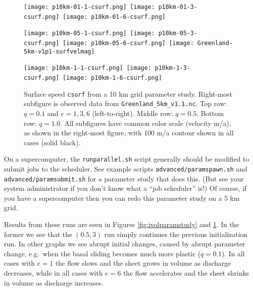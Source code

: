 \begin{figure}[ht]
\centering
\mbox{\texttt{[image: p10km-01-1-csurf.png]} \texttt{[image: p10km-01-3-csurf.png]} \texttt{[image: p10km-01-6-csurf.png]} \qquad \hspace{1.87in}}

\mbox{\texttt{[image: p10km-05-1-csurf.png]} \texttt{[image: p10km-05-3-csurf.png]} \texttt{[image: p10km-05-6-csurf.png]} 
\texttt{[image: Greenland-5km-v1p1-surfvelmag]}}
\smallskip

\mbox{\texttt{[image: p10km-1-1-csurf.png]} \texttt{[image: p10km-1-3-csurf.png]} \texttt{[image: p10km-1-6-csurf.png]} \qquad \hspace{1.87in}}

\caption{Surface speed \texttt{csurf} from a 10 km grid parameter study.  Right-most subfigure is observed data from \texttt{Greenland_5km_v1.1.nc}.  Top row: $q=0.1$ and $e=1,3,6$ (left-to-right).  Middle row: $q=0.5$.  Bottom row: $q=1.0$.  All subfigures have common color scale (velocity m/a), as shown in the right-most figure, with 100 m/a contour shown in all cases (solid black).}
\label{fig:paramstudy}
\end{figure}

On a supercomputer, the \texttt{runparallel.sh} script generally should be modified to submit jobs to the scheduler.  See example scripts \texttt{advanced/paramspawn.sh} and \texttt{advanced/paramsubmit.sh} for a parameter study that does this.  (But see your system administrator if you don't know what a ``job scheduler'' is!)  Of course, if you have a supercomputer then you can redo this parameter study on a 5 km grid.

Results from these runs are seen in Figures \ref{fig:ivolparamstudy} and \ref{fig:paramstudy}.  In the former we see that the $(0.5,3)$ run simply continues the previous initialization run.  In other graphs we see abrupt initial changes, caused by abrupt parameter change, e.g.~when the basal sliding becomes much more plastic ($q=0.1$).  In all cases with $e=1$ the flow slows and the sheet grows in volume as discharge decreases, while in all cases with $e=6$ the flow accelerates and the sheet shrinks in volume as discharge increases.

